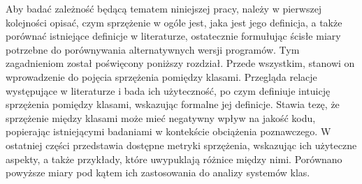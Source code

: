 Aby badać zależność będącą tematem niniejszej pracy, należy w pierwszej kolejności opisać, czym sprzężenie w
ogóle jest, jaka jest jego definicja, a także porównać istniejące definicje w literaturze, ostatecznie formułując
ścisłe miary potrzebne do porównywania alternatywnych wersji programów.
Tym zagadnieniom został poświęcony poniższy rozdział.
Przede wszystkim, stanowi on wprowadzenie do pojęcia sprzężenia pomiędzy klasami.
Przegląda relacje występujące w literaturze i bada ich użyteczność, po czym definiuje intuicję sprzężenia pomiędzy
klasami, wskazując formalne jej definicje.
Stawia tezę, że sprzężenie między klasami może mieć negatywny wpływ na jakość kodu, popierając istniejącymi
badaniami w kontekście obciążenia poznawczego.
W ostatniej części przedstawia dostępne metryki sprzężenia, wskazując ich użyteczne aspekty, a także
przykłady, które uwypuklają różnice między nimi.
Porównano powyższe miary pod kątem ich zastosowania do analizy systemów klas.